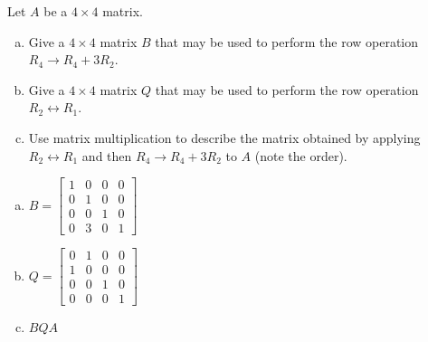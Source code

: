 
\begin{exerciseStatement}


Let \(A\) be a \(4 \times 4\) matrix.


\begin{enumerate}[(a)]
\item Give a \(4 \times 4\) matrix \(B\) that may be used to perform the row operation \( R_4 \to R_4 + 3R_2 \).
\item Give a \(4 \times 4\) matrix \(Q\) that may be used to perform the row operation \( R_2 \leftrightarrow R_1 \).
\item Use matrix multiplication to describe the matrix obtained by applying \( R_2 \leftrightarrow R_1 \) and then \( R_4 \to R_4 + 3R_2 \) to \(A\) (note the order). 
\end{enumerate}
    
\end{exerciseStatement}
    
\begin{exerciseAnswer} 

\begin{enumerate}[(a)]
\item \(B= \left[\begin{array}{cccc}
1 & 0 & 0 & 0 \\
0 & 1 & 0 & 0 \\
0 & 0 & 1 & 0 \\
0 & 3 & 0 & 1
\end{array}\right] \)
\item \(Q= \left[\begin{array}{cccc}
0 & 1 & 0 & 0 \\
1 & 0 & 0 & 0 \\
0 & 0 & 1 & 0 \\
0 & 0 & 0 & 1
\end{array}\right] \)
\item \(BQA\)
\end{enumerate}
    
\end{exerciseAnswer}
    
